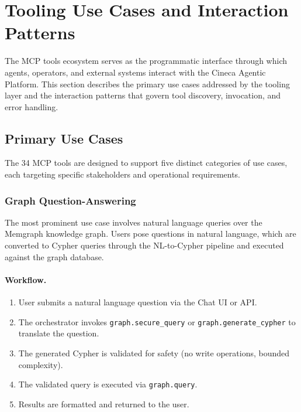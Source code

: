 
\section{Tooling Use Cases and Interaction Patterns}
\label{sec:tooling-use-cases}

The MCP tools ecosystem serves as the programmatic interface through which agents, operators, and external systems interact with the Cineca Agentic Platform. This section describes the primary use cases addressed by the tooling layer and the interaction patterns that govern tool discovery, invocation, and error handling.

\subsection{Primary Use Cases}
\label{subsec:tool-use-cases}

The 34 MCP tools are designed to support five distinct categories of use cases, each targeting specific stakeholders and operational requirements.

\subsubsection{Graph Question-Answering}

The most prominent use case involves natural language queries over the Memgraph knowledge graph. Users pose questions in natural language, which are converted to Cypher queries through the NL-to-Cypher pipeline and executed against the graph database.

\paragraph{Workflow.}
\begin{enumerate}
    \item User submits a natural language question via the Chat UI or API.
    \item The orchestrator invokes \texttt{graph.secure\_query} or \texttt{graph.generate\_cypher} to translate the question.
    \item The generated Cypher is validated for safety (no write operations, bounded complexity).
    \item The validated query is executed via \texttt{graph.query}.
    \item Results are formatted and returned to the user.
\end{enumerate}

